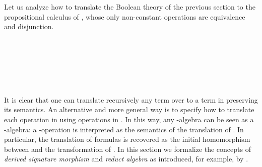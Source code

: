 Let us analyze how to translate the Boolean theory of the previous
section to the propositional calculus of \cite{dijkstra-scholten},
whose only non-constant operations are equivalence and disjunction.
\begin{code}
\>[0]\AgdaSpace{}%
\AgdaSpace{}%
\AgdaSymbol{:}\AgdaSpace{}%
\AgdaSpace{}%
\AgdaSpace{}%
\AgdaSpace{}%
\AgdaSpace{}%
\AgdaSpace{}%
\AgdaSpace{}%
\<%
\\
\>[0][@{}l@{\AgdaIndent{0}}]%
\>[2]\AgdaSpace{}%
%
\>[14]\AgdaSymbol{:}\AgdaSpace{}%
\AgdaSpace{}%
\AgdaSymbol{(}\AgdaInductiveConstructor{[]}\AgdaSpace{}%
\AgdaOperator{\AgdaInductiveConstructor{,}}\AgdaSpace{}%
\AgdaSymbol{)}\<%
\\
%
\>[2]\AgdaSpace{}%
%
\>[14]\AgdaSymbol{:}\AgdaSpace{}%
\AgdaSpace{}%
\AgdaSymbol{((}\AgdaSpace{}%
\AgdaSpace{}%
\AgdaOperator{\AgdaFunction{[}}\AgdaSpace{}%
\AgdaSpace{}%
\AgdaOperator{\AgdaFunction{]}}\AgdaSymbol{)}\AgdaSpace{}%
\AgdaOperator{\AgdaInductiveConstructor{,}}\AgdaSpace{}%
\AgdaSymbol{)}\<%
\\
\\[\AgdaEmptyExtraSkip]%
\>[0]\AgdaSpace{}%
\AgdaSymbol{:}\AgdaSpace{}%
\<%
\\
\>[0]\AgdaSpace{}%
\AgdaSymbol{=}\AgdaSpace{}%
\AgdaSpace{}%
\AgdaSymbol{\{}\AgdaSpace{}%
\AgdaSpace{}%
\AgdaSymbol{=}\AgdaSpace{}%
\AgdaSpace{}%
\AgdaSymbol{;}\AgdaSpace{}%
\AgdaSpace{}%
\AgdaSymbol{=}\AgdaSpace{}%
\AgdaSpace{}%
\AgdaSymbol{\}}\<%
\end{code}

It is clear that one can translate recursively any term over
 to a term in 
preserving its semantics. %
An alternative and more general way is to specify how to translate
each operation in  using operations in
. In this way, any
-algebra can be seen as a
-algebra: a
-operation  is interpreted as
the semantics of the translation of . In particular,
the translation of formulas is recovered as the initial
homomorphism between
\AgdaSpace{} and the
transformation of
\AgdaSpace{}. In this
section we formalize the concepts of \emph{derived signature
  morphism} and \emph{reduct algebra} as introduced, for example,
by \cite{sannella2012foundations}.

